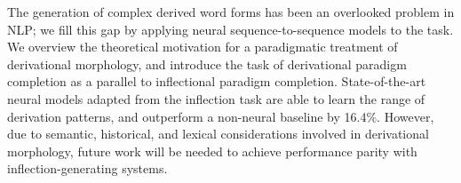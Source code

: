 The generation of complex derived word forms has been an overlooked problem in NLP; we fill this gap by applying neural sequence-to-sequence models to the task. We overview the theoretical motivation for a paradigmatic treatment of derivational morphology, and introduce the task of derivational paradigm completion as a parallel to inflectional paradigm completion. State-of-the-art neural models adapted from the inflection task are able to learn the range of derivation patterns, and outperform a non-neural baseline by 16.4\%. However, due to semantic, historical, and lexical considerations involved in derivational morphology, future work will be needed to achieve performance parity with inflection-generating systems.

